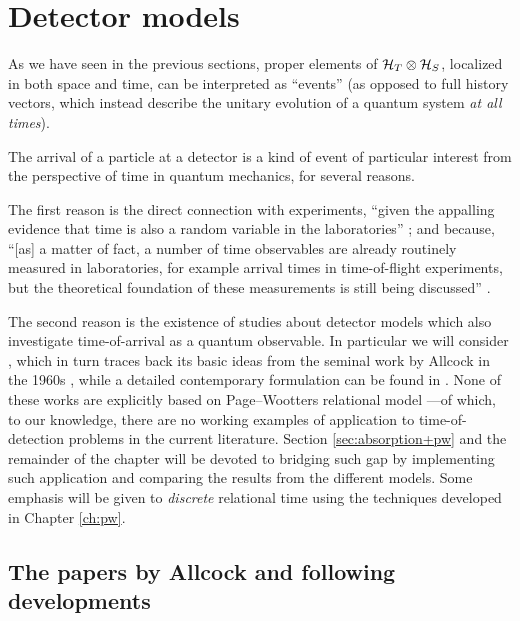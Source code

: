 \section{Detector models}

As we have seen in the previous sections,
proper elements of $\mathcal{H}_T \otimes \mathcal{H}_S$,
localized in both space and time,
can be interpreted as ``events''
(as opposed to full history vectors, which instead describe the unitary evolution
of a quantum system \emph{at all times}).

The arrival of a particle at a detector
is a kind of event
of particular interest from the perspective of time
in quantum mechanics, for several reasons.

The first reason
is the direct connection with experiments,
``given the appalling evidence that time is also a random variable in the laboratories''
\parencite{TQM2:Detector};
and because,
``{[as]} a matter of fact, a number of time observables are already routinely measured in laboratories,
for example arrival times in time-of-flight experiments,
but the theoretical foundation of these measurements is still being discussed''
\parencite[Preface to the First Ed.]{TQM1}.

The second reason is the existence of studies
about detector models which also investigate
time-of-arrival as a quantum observable.
In particular we will consider \cite{RuschhauptAbsorption},
which in turn traces back its basic ideas from the seminal work by Allcock
in the 1960s \parencite{Allcock-1, Allcock-2, Allcock-3},
while a detailed contemporary formulation can be found in
\cite{TQM2:Detector}.
None of these works are explicitly
based on Page--Wootters relational model ---of which, to our knowledge,
there are no working examples of application to
time-of-detection problems in the current literature.
Section \ref{sec:absorption+pw} and the remainder of the chapter
will be devoted to bridging such gap
by implementing such application
and comparing
the results from the different models.
Some emphasis will be given to
\emph{discrete} relational time
using the techniques developed in Chapter \ref{ch:pw}.

\subsection{The papers by Allcock and following developments}

